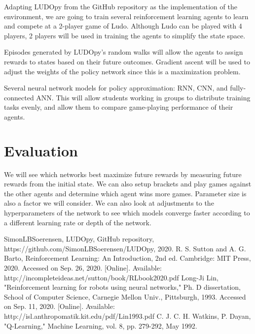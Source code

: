 \documentclass[conference]{IEEEtran}
\begin{document}
Adapting LUDOpy from the GitHub repository as the implementation of the
environment, we are going to train several reinforcement learning agents to
learn and compete at a 2-player game of Ludo.  Although Ludo can be played
with 4 players, 2 players will be used in training the agents to simplify
the state space.

Episodes generated by LUDOpy's random walks will allow the agents to assign
rewards to states based on their future outcomes. Gradient ascent will be used
to adjust the weights of the policy network since this is a maximization
problem.

Several neural network models for policy approximation: RNN, CNN, and
fully-connected ANN. This will allow students working in groups to distribute
training tasks evenly, and allow them to compare game-playing performance of
their agents.

\section{Evaluation}

We will see which networks best maximize future rewards by measuring future
rewards from the initial state. We can also setup brackets and play games
against the other agents and determine which agent wins more games. Parameter
size is also a factor we will consider. We can also look at adjustments to the
hyperparameters of the network to see which models converge faster according
to a different learning rate or depth of the network.

\begin{thebibliography}{00}
 SimonLBSoerensen, LUDOpy, GitHub repository,
    https://github.com/SimonLBSoerensen/LUDOpy, 2020.
 R. S. Sutton and A. G. Barto, Reinforcement Learning: An
    Introduction, 2nd ed. Cambridge: MIT Press, 2020. Accessed on Sep. 26,
        2020. [Online]. Available:
        http://incompleteideas.net/sutton/book/RLbook2020.pdf
 Long-Ji Lin, "Reinforcement learning for robots using neural
    networks," Ph. D dissertation, School of Computer Science, Carnegie Mellon
        Univ., Pittsburgh, 1993. Accessed on Sep. 11, 2020. [Online].
        Available: http://isl.anthropomatik.kit.edu/pdf/Lin1993.pdf
 C. J. C. H. Watkins, P. Dayan, "Q-Learning," Machine Learning,
    vol. 8, pp. 279-292, May 1992.
\end{thebibliography}
\vspace{12pt}
\end{document}
